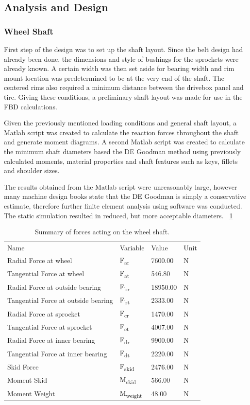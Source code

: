 \subsection{Analysis and Design}
\subsubsection{Wheel Shaft}
First step of the design was to set up the shaft layout. Since the belt design had already been done, the dimensions and style of bushings for the sprockets were already known. A certain width was then set aside for bearing width and rim mount location was predetermined to be at the very end of the shaft. The centered rims also required a minimum distance between the drivebox panel and tire. Giving these conditions, a preliminary shaft layout was made for use in the FBD calculations.

Given the previously mentioned loading conditions and general shaft layout, a Matlab script was created to calculate the reaction forces throughout the shaft and generate moment diagrams. A second Matlab script was created to calculate the minimum shaft diameters based the DE Goodman method using previously calculated moments, material properties and shaft features such as keys, fillets and shoulder sizes.

The results obtained from the Matlab script were unreasonably large, however many machine design books state that the DE Goodman is simply a conservative estimate, therefore further finite element analysis using software was conducted. The static simulation resulted in reduced, but more acceptable diameters. 
~\ref {tab:shaft_calc}

\begin{table}[htbp]
	\centering
	\caption{Summary of forces acting on the wheel shaft.}
	\begin{tabular}{| llll |} \hline
		Name & Variable & Value & Unit \\
		Radial Force at wheel & F\textsubscript{ar} & 7600.00 & N \\
		Tangential Force at wheel & F\textsubscript{at} & 546.80 & N \\
		Radial Force at outside bearing & F\textsubscript{br} & 18950.00 & N \\
		Tangential Force at outside bearing & F\textsubscript{bt} & 2333.00 & N \\
		Radial Force at sprocket & F\textsubscript{cr} & 1470.00 & N \\
		Tangential Force at sprocket & F\textsubscript{ct} & 4007.00 & N \\
		Radial Force at inner bearing & F\textsubscript{dr} & 9900.00 & N \\
		Tangential Force at inner bearing & F\textsubscript{dt} & 2220.00 & N \\
		Skid Force & F\textsubscript{skid} & 2476.00 & N \\
		Moment Skid & M\textsubscript{skid} & 566.00 & N \\
		Moment Weight & M\textsubscript{weight} & 48.00 & N \\ \hline
	\end{tabular}
	\label{tab:shaft_calc}
\end{table}

